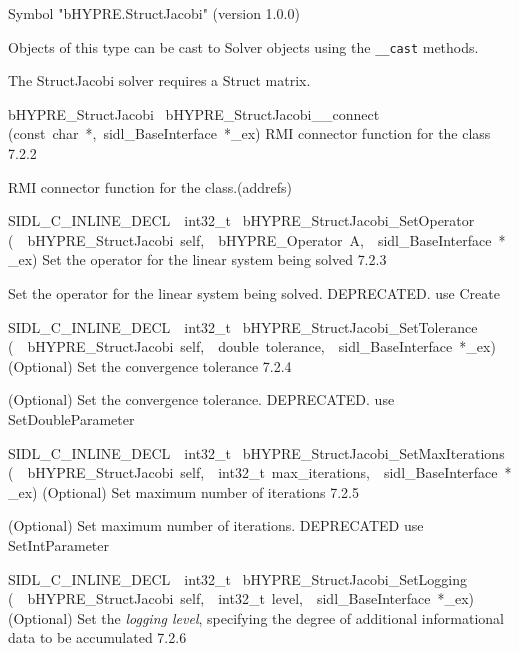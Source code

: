 \documentclass{article}
\begin{document}
\begin{cxxentry}
\begin{cxxentry}
\begin{cxxvariable}
\begin{cxxdoc}
Symbol "bHYPRE.StructJacobi" (version 1.0.0)

Objects of this type can be cast to Solver objects
using the {\tt \_\_cast} methods.

The StructJacobi solver requires a Struct matrix.
\end{cxxdoc}
\end{cxxvariable}
\begin{cxxfunction}
{bHYPRE\_StructJacobi\ }
        {bHYPRE\_StructJacobi\_\_connect}
        {(const\ char\ *,\ sidl\_BaseInterface\ *\_ex)}
        {
RMI connector function for the class}
        {7.2.2}
\begin{cxxdoc}

RMI connector function for the class.(addrefs)
\end{cxxdoc}
\end{cxxfunction}
\begin{cxxfunction}
{SIDL\_C\_INLINE\_DECL\ \ int32\_t\ }
        {bHYPRE\_StructJacobi\_SetOperator}
        {(\ \ bHYPRE\_StructJacobi\ self,\ \ bHYPRE\_Operator\ A,\ \ sidl\_BaseInterface\ *\_ex)}
        {
Set the operator for the linear system being solved}
        {7.2.3}
\begin{cxxdoc}

Set the operator for the linear system being solved.
DEPRECATED.  use Create
\end{cxxdoc}
\end{cxxfunction}
\begin{cxxfunction}
{SIDL\_C\_INLINE\_DECL\ \ int32\_t\ }
        {bHYPRE\_StructJacobi\_SetTolerance}
        {(\ \ bHYPRE\_StructJacobi\ self,\ \ double\ tolerance,\ \ sidl\_BaseInterface\ *\_ex)}
        {
(Optional) Set the convergence tolerance}
        {7.2.4}
\begin{cxxdoc}

(Optional) Set the convergence tolerance.
DEPRECATED.  use SetDoubleParameter
\end{cxxdoc}
\end{cxxfunction}
\begin{cxxfunction}
{SIDL\_C\_INLINE\_DECL\ \ int32\_t\ }
        {bHYPRE\_StructJacobi\_SetMaxIterations}
        {(\ \ bHYPRE\_StructJacobi\ self,\ \ int32\_t\ max\_iterations,\ \ sidl\_BaseInterface\ *\_ex)}
        {
(Optional) Set maximum number of iterations}
        {7.2.5}
\begin{cxxdoc}

(Optional) Set maximum number of iterations.
DEPRECATED   use SetIntParameter
\end{cxxdoc}
\end{cxxfunction}
\begin{cxxfunction}
{SIDL\_C\_INLINE\_DECL\ \ int32\_t\ }
        {bHYPRE\_StructJacobi\_SetLogging}
        {(\ \ bHYPRE\_StructJacobi\ self,\ \ int32\_t\ level,\ \ sidl\_BaseInterface\ *\_ex)}
        {
(Optional) Set the {\it logging level}, specifying the degree
of additional informational data to be accumulated}
        {7.2.6}
\begin{cxxdoc}


\end{cxxdoc}
\end{cxxfunction}
\end{cxxentry}
\end{cxxentry}
\end{document}
